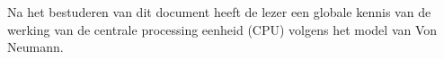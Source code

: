 Na het bestuderen van dit document heeft de lezer een globale kennis van de werking van de centrale processing eenheid (CPU) volgens het model van Von Neumann.


